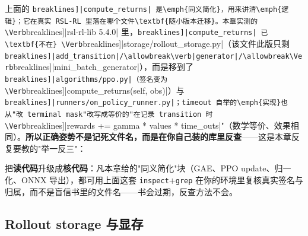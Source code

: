 \begin{note}
上面的 \Verb[breaklines]|compute_returns| 是\emph{同义简化}，用来讲清\emph{逻辑}；它在真实 RSL-RL 里落在哪个文件\textbf{随小版本迁移}。本章实测的 \Verb[breaklines]|rsl-rl-lib 5.4.0| 里，\Verb[breaklines]|compute_returns| 已\textbf{不在} \Verb[breaklines]|storage/rollout_storage.py|（该文件此版只剩 \Verb[breaklines]|add_transition|/\allowbreak\verb|generator|/\allowbreak\Verb[breaklines]|mini_batch_generator|），而是移到了 \Verb[breaklines]|algorithms/ppo.py|（签名变为 \Verb[breaklines]|compute_returns(self, obs)|）与 \Verb[breaklines]|runners/on_policy_runner.py|；timeout 自举的\emph{实现}也从"改 terminal mask"改写成等价的"在记录 transition 时 \Verb[breaklines]|rewards += gamma * values * time_outs|"（数学等价、效果相同）。\textbf{所以正确姿势不是记死文件名，而是在你自己装的库里反查}——这是本章反复要教的"举一反三"：
把\textbf{读代码}升级成\textbf{核代码}：凡本章给的"同义简化"块（GAE、PPO update、归一化、ONNX 导出），都可用上面这套 \verb|inspect|+\verb|grep| 在你的环境里复核真实签名与归属，而不是盲信书里的文件名——书会过期，反查方法不会。
\end{note}

\subsection{Rollout storage 与显存}

